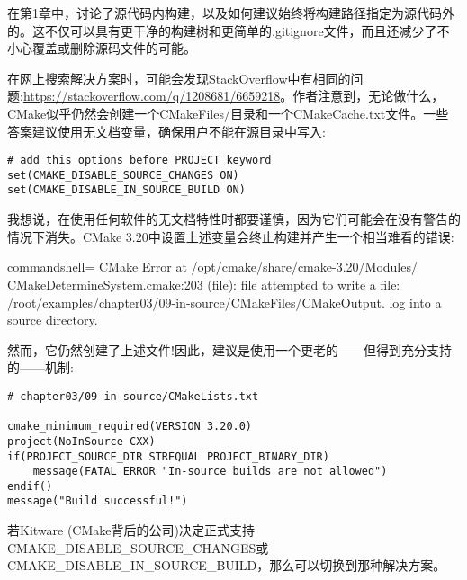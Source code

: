 在第1章中，讨论了源代码内构建，以及如何建议始终将构建路径指定为源代码外的。这不仅可以具有更干净的构建树和更简单的.gitignore文件，而且还减少了不小心覆盖或删除源码文件的可能。

在网上搜索解决方案时，可能会发现StackOverflow中有相同的问题:\url{https://stackoverflow.com/q/1208681/6659218}。作者注意到，无论做什么，CMake似乎仍然会创建一个CMakeFiles/目录和一个CMakeCache.txt文件。一些答案建议使用无文档变量，确保用户不能在源目录中写入:

\begin{lstlisting}[style=styleCMake]
# add this options before PROJECT keyword
set(CMAKE_DISABLE_SOURCE_CHANGES ON)
set(CMAKE_DISABLE_IN_SOURCE_BUILD ON)
\end{lstlisting}

我想说，在使用任何软件的无文档特性时都要谨慎，因为它们可能会在没有警告的情况下消失。CMake 3.20中设置上述变量会终止构建并产生一个相当难看的错误:

\begin{tcblisting}{commandshell={}}
CMake Error at /opt/cmake/share/cmake-3.20/Modules/
CMakeDetermineSystem.cmake:203 (file):
  file attempted to write a file:
  /root/examples/chapter03/09-in-source/CMakeFiles/CMakeOutput.
log into a source directory.
\end{tcblisting}

然而，它仍然创建了上述文件!因此，建议是使用一个更老的——但得到充分支持的——机制:

\begin{lstlisting}[style=styleCMake]
# chapter03/09-in-source/CMakeLists.txt

cmake_minimum_required(VERSION 3.20.0)
project(NoInSource CXX)
if(PROJECT_SOURCE_DIR STREQUAL PROJECT_BINARY_DIR)
	message(FATAL_ERROR "In-source builds are not allowed")
endif()
message("Build successful!")
\end{lstlisting}

若Kitware (CMake背后的公司)决定正式支持CMAKE\_DISABLE\_SOURCE\_CHANGES或CMAKE\_DISABLE\_IN\_SOURCE\_BUILD，那么可以切换到那种解决方案。














